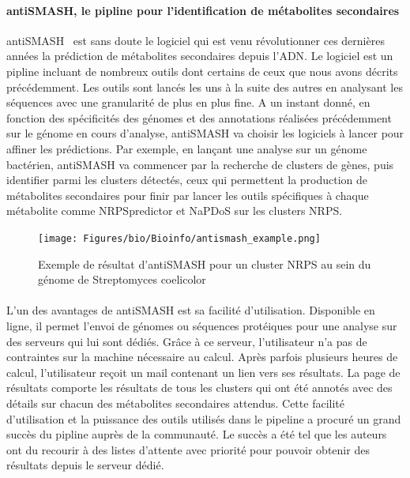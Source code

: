 \documentclass[12pt,french,twoside]{report}
\begin{document}
\paragraph{antiSMASH, le pipline pour l'identification de métabolites secondaires}
antiSMASH~\cite{weber_antismash_2015,medema_antismash:_2011} est sans doute le logiciel qui est venu révolutionner ces dernières années la prédiction de métabolites secondaires depuis l'ADN.
Le logiciel est un pipline incluant de nombreux outils dont certains de ceux que nous avons décrits précédemment.
Les outils sont lancés les uns à la suite des autres en analysant les séquences avec une granularité de plus en plus fine.
A un instant donné, en fonction des spécificités des génomes et des annotations réalisées précédemment sur le génome en cours d'analyse, antiSMASH va choisir les logiciels à lancer pour affiner les prédictions.
Par exemple, en lançant une analyse sur un génome bactérien, antiSMASH va commencer par la recherche de clusters de gènes, puis identifier parmi les clusters détectés, ceux qui permettent la production de métabolites secondaires pour finir par lancer les outils spécifiques à chaque métabolite comme NRPSpredictor et NaPDoS sur les clusters NRPS.

\begin{figure}
  \begin{center}
    \texttt{[image: Figures/bio/Bioinfo/antismash\_example.png]}
    \caption{\label{antismash_result}Exemple de résultat d'antiSMASH pour un cluster NRPS au sein du génome de Streptomyces coelicolor}
  \end{center}
\end{figure}

\paragraph{}L'un des avantages de antiSMASH est sa facilité d'utilisation.
Disponible en ligne, il permet l'envoi de génomes ou séquences protéiques pour une analyse sur des serveurs qui lui sont dédiés.
Grâce à ce serveur, l'utilisateur n'a pas de contraintes sur la machine nécessaire au calcul.
Après parfois plusieurs heures de calcul, l'utilisateur reçoit un mail contenant un lien vers ses résultats.
La page de résultats comporte les résultats de tous les clusters qui ont été annotés avec des détails sur chacun des métabolites secondaires attendus.
Cette facilité d'utilisation et la puissance des outils utilisés dans le pipeline a procuré un grand succès du pipline auprès de la communauté.
Le succès a été tel que les auteurs ont du recourir à des listes d'attente avec priorité pour pouvoir obtenir des résultats depuis le serveur dédié.
\end{document}
